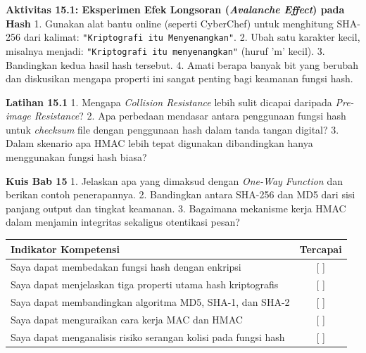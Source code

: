 \documentclass[../main.tex]{subfiles}
\begin{document}
\begin{obeactivity}
\textbf{Aktivitas 15.1: Eksperimen Efek Longsoran (\textit{Avalanche Effect}) pada Hash}
1. Gunakan alat bantu online (seperti CyberChef) untuk menghitung SHA-256 dari kalimat: \texttt{"Kriptografi itu Menyenangkan"}.
2. Ubah satu karakter kecil, misalnya menjadi: \texttt{"Kriptografi itu menyenangkan"} (huruf 'm' kecil).
3. Bandingkan kedua hasil hash tersebut.
4. Amati berapa banyak bit yang berubah dan diskusikan mengapa properti ini sangat penting bagi keamanan fungsi hash.
\end{obeactivity}

\begin{obereflection}
\textbf{Latihan 15.1}
1. Mengapa \textit{Collision Resistance} lebih sulit dicapai daripada \textit{Pre-image Resistance}?
2. Apa perbedaan mendasar antara penggunaan fungsi hash untuk \textit{checksum} file dengan penggunaan hash dalam tanda tangan digital?
3. Dalam skenario apa HMAC lebih tepat digunakan dibandingkan hanya menggunakan fungsi hash biasa?
\end{obereflection}

\begin{obeassessment}
\textbf{Kuis Bab 15}
1. Jelaskan apa yang dimaksud dengan \textit{One-Way Function} dan berikan contoh penerapannya.
2. Bandingkan antara SHA-256 dan MD5 dari sisi panjang output dan tingkat keamanan.
3. Bagaimana mekanisme kerja HMAC dalam menjamin integritas sekaligus otentikasi pesan?
\end{obeassessment}

\begin{competencychecklist}
\begin{tabularx}{\linewidth}{|X|c|}
\hline
Indikator Kompetensi & Tercapai \\
\hline
Saya dapat membedakan fungsi hash dengan enkripsi & [ ] \\
\hline
Saya dapat menjelaskan tiga properti utama hash kriptografis & [ ] \\
\hline
Saya dapat membandingkan algoritma MD5, SHA-1, dan SHA-2 & [ ] \\
\hline
Saya dapat menguraikan cara kerja MAC dan HMAC & [ ] \\
\hline
Saya dapat menganalisis risiko serangan kolisi pada fungsi hash & [ ] \\
\hline
\end{tabularx}
\end{competencychecklist}
\end{document}
